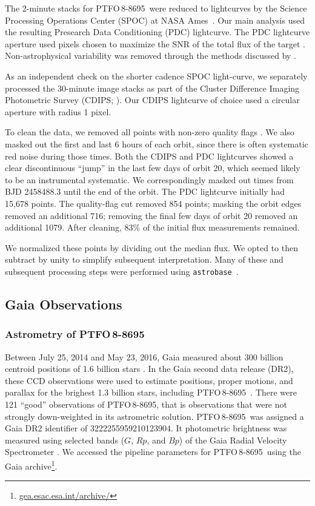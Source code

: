 \documentclass[12pt,twocolumn,tighten]{aastex62}
\newcommand{\ptfo}{PTFO$\,$8-8695}
\begin{document}
The 2-minute stacks for \ptfo\ were reduced to lightcurves by the
Science Processing Operations Center (SPOC) at NASA
Ames~\citep{jenkins_tess_2016}.  Our main analysis used the resulting
Presearch Data Conditioning (PDC) lightcurve.  The PDC lightcurve
aperture used pixels chosen to maximize the SNR of the total flux of
the target \citep{smith_kepler_apertures_2017}.  Non-astrophysical
variability was removed through the methods discussed by
\citet{smith_kepler_PDC_2017}.

As an independent check on the shorter cadence SPOC light-curve, we
separately processed the 30-minute image stacks as part of the Cluster
Difference Imaging Photometric Survey (CDIPS;
\citealt{bouma_cluster_2019}).  Our CDIPS lightcurve  of choice used a
circular aperture with radius 1 pixel.

To clean the data, we removed all points with non-zero quality flags
\citep[{\it e.g.},][]{tess_data_product_description_2018}.  We also
masked out the first and last 6 hours of each orbit, since there is
often systematic red noise during those times.  Both the CDIPS and PDC
lightcurves showed a clear discontinuous ``jump'' in the last few days
of orbit 20, which seemed likely to be an instrumental systematic.  We
correspondingly masked out times from BJD 2458488.3 until the end of
the orbit.  The PDC lightcurve initially had 15{,}678 points.  The
quality-flag cut removed 854 points; masking the orbit edges removed an
additional 716; removing the final few days of orbit 20 removed an
additional 1079.  After cleaning, 83\% of the initial flux
measurements remained.

We normalized these points by dividing out the median flux. We opted
to then subtract by unity to simplify subsequent interpretation.  Many
of these and subsequent processing steps were performed using
\texttt{astrobase}~\citep{bhatti_astrobase_2018}. 


\subsection{Gaia Observations}

\subsubsection{Astrometry of \ptfo}

Between July 25, 2014 and May 23, 2016, Gaia measured about 300
billion centroid positions of 1{.}6 billion stars
\citep{gaia_collaboration_gaia_2016,lindegren_gaiasoln_2018,gaia_collaboration_gaia_2018}.
In the Gaia second data release (DR2), these CCD observations were
used to estimate positions, proper motions, and parallax for the
brighest 1{.}3 billion stars, including \ptfo\ 
\citep{lindegren_gaiasoln_2018}.  There were 121 ``good'' observations
of \ptfo, that is observations that were not strongly down-weighted in
its astrometric solution.  \ptfo\ was assigned a Gaia DR2 identifier
of 3222255959210123904.  It photometric brightness was measured using
selected bands ($G$, $Rp$, and $Bp$) of the Gaia Radial Velocity
Spectrometer \citep{cropper_gaia_2018,evans_gaia_2018}.  We accessed
the pipeline parameters for \ptfo\ using the Gaia
archive\footnote{\url{gea.esac.esa.int/archive/}}.
\end{document}
